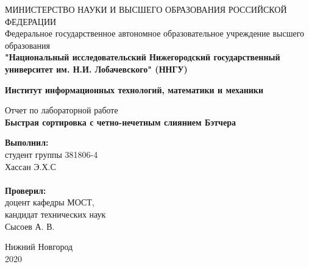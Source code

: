 \documentclass[a4paper]{report}
\begin{document}
\begin{titlepage}
\begin{center}
МИНИСТЕРСТВО НАУКИ И ВЫСШЕГО ОБРАЗОВАНИЯ РОССИЙСКОЙ ФЕДЕРАЦИИ\\
Федеральное государственное автономное образовательное учреждение высшего образования \\
\textbf{"Национальный исследовательский Нижегородский государственный университет им. Н.И. Лобачевского" (ННГУ)}
\end{center}

\begin{center}
\textbf{Институт информационных технологий, математики и механики}
\end{center}
\vspace{4em}

\begin{center}
Отчет по лабораторной работе \\
\vspace{1em}
\textbf{\Large Быстрая сортировка с четно-нечетным слиянием Бэтчера} \\
\end{center}

\vspace{4em}

\newbox{\lbox}
\newlength{\maxl}
\setlength{\maxl}{\wd\lbox}
\hfill\parbox{7cm}{
\textbf{Выполнил:} \\ 
студент группы 381806-4 \\
Хассан Э.Х.С \\
\\
\textbf{Проверил:} \\ 
доцент кафедры МОСТ, \\ 
кандидат технических наук \\ 
Сысоев А. В.
}
\vspace{\fill}

\begin{center} Нижний Новгород \\ 2020 \end{center}
\end{titlepage}

\setcounter{page}{2}
\tableofcontents{}
\clearpage
\end{document}
